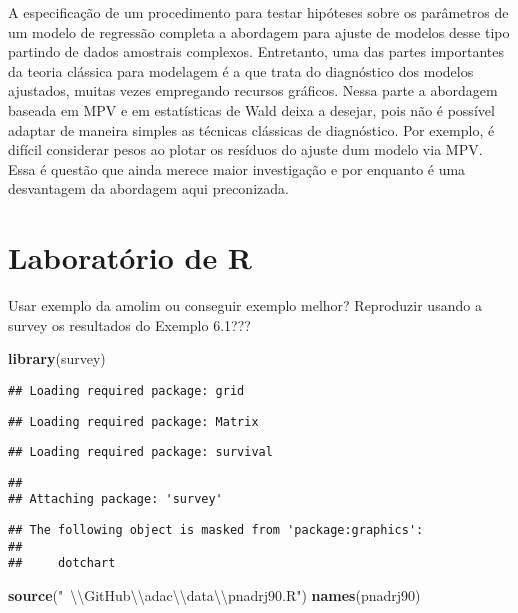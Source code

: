 \documentclass[]{book}
\newenvironment{Shaded}{\begin{snugshade}}{\end{snugshade}}
\newcommand{\KeywordTok}[1]{\textcolor[rgb]{0.13,0.29,0.53}{\textbf{{#1}}}}
\newcommand{\CharTok}[1]{\textcolor[rgb]{0.31,0.60,0.02}{{#1}}}
\newcommand{\StringTok}[1]{\textcolor[rgb]{0.31,0.60,0.02}{{#1}}}
\newcommand{\NormalTok}[1]{{#1}}
\begin{document}
A especificação de um procedimento para testar hipóteses sobre os
parâmetros de um modelo de regressão completa a abordagem para ajuste de
modelos desse tipo partindo de dados amostrais complexos. Entretanto,
uma das partes importantes da teoria clássica para modelagem é a que
trata do diagnóstico dos modelos ajustados, muitas vezes empregando
recursos gráficos. Nessa parte a abordagem baseada em MPV e em
estatísticas de Wald deixa a desejar, pois não é possível adaptar de
maneira simples as técnicas clássicas de diagnóstico. Por exemplo, é
difícil considerar pesos ao plotar os resíduos do ajuste dum modelo via
MPV. Essa é questão que ainda merece maior investigação e por enquanto é
uma desvantagem da abordagem aqui preconizada.

\section{Laboratório de R}\label{laboratorio-de-r}

Usar exemplo da amolim ou conseguir exemplo melhor? Reproduzir usando a
survey os resultados do Exemplo 6.1???

\begin{Shaded}
\begin{Highlighting}[]
\KeywordTok{library}\NormalTok{(survey)}
\end{Highlighting}
\end{Shaded}

\begin{verbatim}
## Loading required package: grid
\end{verbatim}

\begin{verbatim}
## Loading required package: Matrix
\end{verbatim}

\begin{verbatim}
## Loading required package: survival
\end{verbatim}

\begin{verbatim}
## 
## Attaching package: 'survey'
\end{verbatim}

\begin{verbatim}
## The following object is masked from 'package:graphics':
## 
##     dotchart
\end{verbatim}

\begin{Shaded}
\begin{Highlighting}[]
\KeywordTok{source}\NormalTok{(}\StringTok{"~}\CharTok{\textbackslash{}\textbackslash{}}\StringTok{GitHub}\CharTok{\textbackslash{}\textbackslash{}}\StringTok{adac}\CharTok{\textbackslash{}\textbackslash{}}\StringTok{data}\CharTok{\textbackslash{}\textbackslash{}}\StringTok{pnadrj90.R"}\NormalTok{)}
\KeywordTok{names}\NormalTok{(pnadrj90)}
\end{Highlighting}
\end{Shaded}
\end{document}
